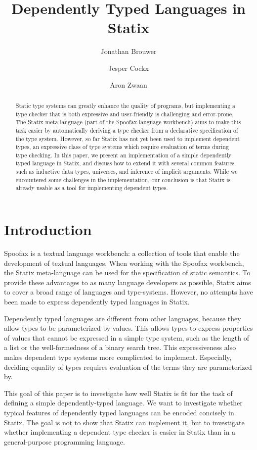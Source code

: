 \documentclass[a4paper,UKenglish,cleveref, autoref, thm-restate]{oasics-v2021}
\title{Dependently Typed Languages in Statix}
\author{Jonathan Brouwer}{Delft University of Technology, The Netherlands \and \url{http://jonathanb.nl}}{j.t.brouwer@student.tudelft.nl}{}{}
\author{Jesper Cockx}{Delft University of Technology, The Netherlands \and \url{http://jesper.sikanda.be}}{j.g.h.cockx@tudelft.nl}{}{}
\author{Aron Zwaan}{Delft University of Technology, The Netherlands \and \url{http://aronzwaan.github.io}}{a.s.zwaan@tudelft.nl}{}{}
\begin{document}
\maketitle

\begin{abstract}
Static type systems can greatly enhance the quality of programs, but implementing a type checker that is both expressive and user-friendly is challenging and error-prone. The Statix meta-language (part of the Spoofax language workbench) aims to make this task easier by automatically deriving a type checker from a declarative specification of the type system. However, so far Statix has not yet been used to implement dependent types, an expressive class of type systems which require evaluation of terms during type checking. In this paper, we present an implementation of a simple dependently typed language in Statix, and discuss how to extend it with several common features such as inductive data types, universes, and inference of implicit arguments. While we encountered some challenges in the implementation, our conclusion is that Statix is already usable as a tool for implementing dependent types.
\end{abstract}

\section{Introduction}

Spoofax is a textual language workbench: \label{key}a collection of tools that enable the development of textual languages\cite{spoofax}. When working with the Spoofax workbench, the Statix meta-language can be used for the specification of static semantics. To provide these advantages to as many language developers as possible, Statix aims to cover a broad range of languages and type-systems. However, no attempts have been made to express dependently typed languages in Statix. 

Dependently typed languages are different from other languages, because they allow types to be parameterized by values. This allows types to express properties of values that cannot be expressed in a simple type system, such as the length of a list or the well-formedness of a binary search tree. This expressiveness also makes dependent type systems more complicated to implement. Especially, deciding equality of types requires evaluation of the terms they are parameterized by. 

This goal of this paper is to investigate how well Statix is fit for the task of defining a simple dependently-typed language. We want to investigate whether typical features of dependently typed languages can be encoded concisely in Statix. The goal is not to show that Statix can implement it, but to investigate whether implementing a dependent type checker is easier in Statix than in a general-purpose programming language.
\end{document}
